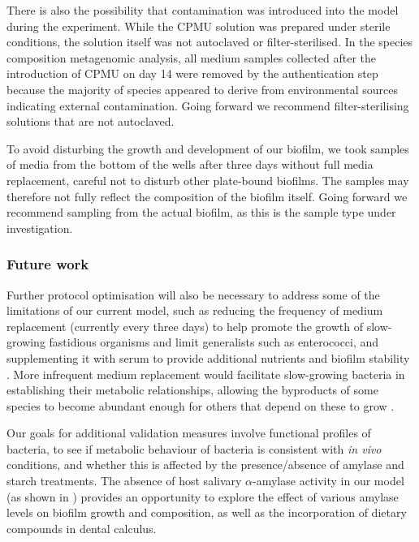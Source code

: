 \documentclass[10pt,a4paper]{article}
\begin{document}
There is also the possibility that contamination was introduced into the
model during the experiment. While the CPMU solution was prepared under
sterile conditions, the solution itself was not autoclaved or
filter-sterilised. In the species composition metagenomic analysis, all
medium samples collected after the introduction of CPMU on day 14 were
removed by the authentication step because the majority of species
appeared to derive from environmental sources indicating external
contamination. Going forward we recommend filter-sterilising solutions
that are not autoclaved.

To avoid disturbing the growth and development of our biofilm, we took
samples of media from the bottom of the wells after three days without
full media replacement, careful not to disturb other plate-bound
biofilms. The samples may therefore not fully reflect the composition of
the biofilm itself. Going forward we recommend sampling from the actual
biofilm, as this is the sample type under investigation.

\subsubsection{Future work}\label{future-work}

Further protocol optimisation will also be necessary to address some of
the limitations of our current model, such as reducing the frequency of
medium replacement (currently every three days) to help promote the
growth of slow-growing fastidious organisms and limit generalists such
as enterococci, and supplementing it with serum to provide additional
nutrients and biofilm stability
\citep{tianUsingDGGE2010, ammannZurichBiofilm2012}. More infrequent
medium replacement would facilitate slow-growing bacteria in
establishing their metabolic relationships, allowing the byproducts of
some species to become abundant enough for others that depend on these
to grow \citep{marshDentalPlaque2005}.

Our goals for additional validation measures involve functional profiles
of bacteria, to see if metabolic behaviour of bacteria is consistent
with \emph{in vivo} conditions, and whether this is affected by the
presence/absence of amylase and starch treatments. The absence of host
salivary \(\alpha\)-amylase activity in our model (as shown in
\citet{bartholdyInvestigatingBiases2022}) provides an opportunity to
explore the effect of various amylase levels on biofilm growth and
composition, as well as the incorporation of dietary compounds in dental
calculus.
\end{document}
